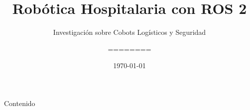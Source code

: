 \documentclass{beamer}
\title{Robótica Hospitalaria con ROS 2}
\subtitle{Investigación sobre Cobots Logísticos y Seguridad}
\author{========}
\date{\today}
\begin{document}
\frame{\titlepage}

\begin{frame}{Contenido}
    \tableofcontents
\end{frame}


\end{document}
